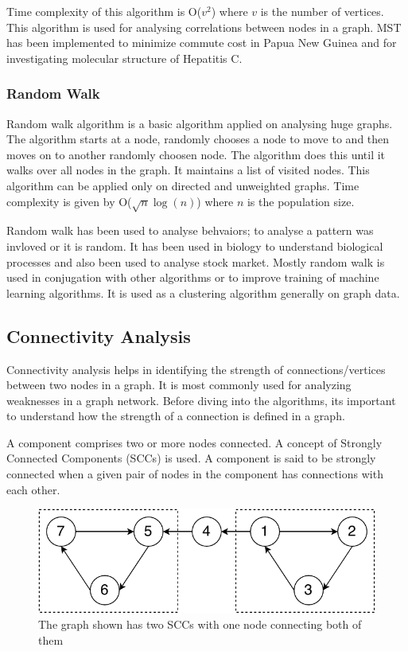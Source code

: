 \documentclass[journal,twoside,web]{ieeecolor}
\begin{document}
Time complexity of this algorithm is O($v^2$) where $v$ is the number of vertices. This algorithm is used for analysing correlations between nodes in a graph. MST has been implemented to minimize commute cost in Papua New Guinea\cite{13} and for investigating molecular structure of Hepatitis C\cite{50}.

\subsubsection{Random Walk}
Random walk algorithm is a basic algorithm applied on analysing huge graphs. The algorithm starts at a node, randomly chooses a node to move to and then moves on to another randomly choosen node. The algorithm does this until it walks over all nodes in the graph. It maintains a list of visited nodes. This algorithm can be applied only on directed and unweighted graphs. Time complexity is given by O($\sqrt{n}\log(n)$) where $n$ is the population size.

Random walk has been used to analyse behvaiors; to analyse a pattern was invloved or it is random. It has been used in biology to understand biological processes\cite{51} and also been used to analyse stock market\cite{52}. Mostly random walk is used in conjugation with other algorithms\cite{53} or to improve training of machine learning algorithms\cite{54}. It is used as a clustering algorithm generally on graph data.

\subsection{Connectivity Analysis}
Connectivity analysis helps in identifying the strength of connections/vertices between two nodes in a graph. It is most commonly used for analyzing weaknesses in a graph network. Before diving into the algorithms, its important to understand how the strength of a connection is defined in a graph.

A component comprises two or more nodes connected. A concept of Strongly Connected Components (SCCs)\cite{39} is used. A component is said to be strongly connected when a given pair of nodes in the component has connections with each other.

\begin{figure}[!h]
    \centerline{\includegraphics[scale=0.75]{figures/scc.pdf}}
    \caption{The graph shown has two SCCs with one node connecting both of them}
    \label{fig4}
\end{figure}
\end{document}
